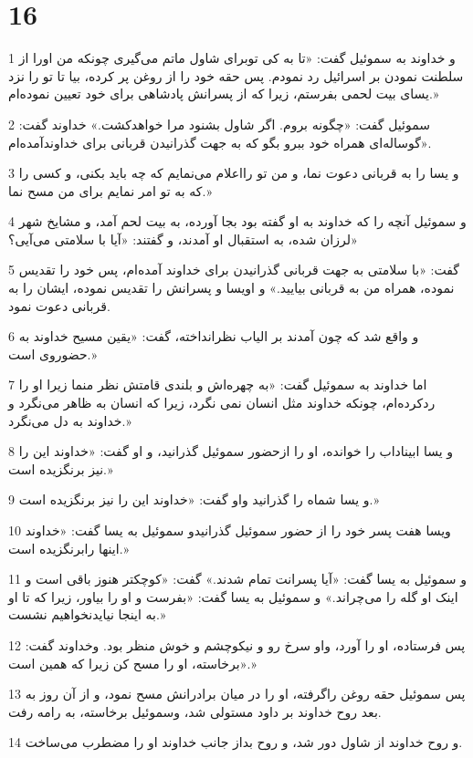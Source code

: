 \chapter{16}

\par 1 و خداوند به سموئیل گفت: «تا به کی توبرای شاول ماتم می‌گیری چونکه من اورا از سلطنت نمودن بر اسرائیل رد نمودم. پس حقه خود را از روغن پر کرده، بیا تا تو را نزد یسای بیت لحمی بفرستم، زیرا که از پسرانش پادشاهی برای خود تعیین نموده‌ام.»
\par 2 سموئیل گفت: «چگونه بروم. اگر شاول بشنود مرا خواهدکشت.» خداوند گفت: «گوساله‌ای همراه خود ببرو بگو که به جهت گذرانیدن قربانی برای خداوندآمده‌ام.
\par 3 و یسا را به قربانی دعوت نما، و من تو رااعلام می‌نمایم که چه باید بکنی، و کسی را که به تو امر نمایم برای من مسح نما.»
\par 4 و سموئیل آنچه را که خداوند به او گفته بود بجا آورده، به بیت لحم آمد، و مشایخ شهر لرزان شده، به استقبال او آمدند، و گفتند: «آیا با سلامتی می‌آیی؟»
\par 5 گفت: «با سلامتی به جهت قربانی گذرانیدن برای خداوند آمده‌ام، پس خود را تقدیس نموده، همراه من به قربانی بیایید.» و اویسا و پسرانش را تقدیس نموده، ایشان را به قربانی دعوت نمود.
\par 6 و واقع شد که چون آمدند بر الیاب نظرانداخته، گفت: «یقین مسیح خداوند به حضوروی است.»
\par 7 اما خداوند به سموئیل گفت: «به چهره‌اش و بلندی قامتش نظر منما زیرا او را ردکرده‌ام، چونکه خداوند مثل انسان نمی نگرد، زیرا که انسان به ظاهر می‌نگرد و خداوند به دل می‌نگرد.»
\par 8 و یسا ابیناداب را خوانده، او را ازحضور سموئیل گذرانید، و او گفت: «خداوند این را نیز برنگزیده است.»
\par 9 و یسا شماه را گذرانید واو گفت: «خداوند این را نیز برنگزیده است.»
\par 10 ویسا هفت پسر خود را از حضور سموئیل گذرانیدو سموئیل به یسا گفت: «خداوند اینها رابرنگزیده است.»
\par 11 و سموئیل به یسا گفت: «آیا پسرانت تمام شدند.» گفت: «کوچکتر هنوز باقی است و اینک او گله را می‌چراند.» و سموئیل به یسا گفت: «بفرست و او را بیاور، زیرا که تا او به اینجا نیایدنخواهیم نشست.»
\par 12 پس فرستاده، او را آورد، واو سرخ رو و نیکوچشم و خوش منظر بود. وخداوند گفت: «برخاسته، او را مسح کن زیرا که همین است.»
\par 13 پس سموئیل حقه روغن راگرفته، او را در میان برادرانش مسح نمود، و از آن روز به بعد روح خداوند بر داود مستولی شد، وسموئیل برخاسته، به رامه رفت.
\par 14 و روح خداوند از شاول دور شد، و روح بداز جانب خداوند او را مضطرب می‌ساخت.
